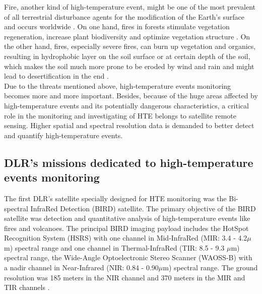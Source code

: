 \noindent Fire, another kind of high-temperature event, might be one of the most prevalent of all terrestrial disturbance agents for the modification of the Earth's surface and occurs worldwide \parencite{Reference6}. On one hand, fires in forests stimulate vegetation regeneration, increase plant biodiversity and optimize vegetation structure \parencite{Reference7}. On the other hand, fires, especially severe fires, can burn up vegetation and organics, resulting in hydrophobic layer on the soil surface or at certain depth of the soil, which makes the soil much more prone to be eroded by wind and rain and might lead to desertification in the end \parencite{Reference8}.\\

\noindent Due to the threats mentioned above, high-temperature events monitoring becomes more and more important. Besides, because of the huge areas affected by high-temperature events and its potentially dangerous characteristics, a critical role in the monitoring and investigating of HTE belongs to satellite remote sensing. Higher spatial and spectral resolution data is demanded to better detect and quantify high-temperature events.\\


\subsection{DLR's missions dedicated to high-temperature events monitoring}

The first DLR's satellite specially designed for HTE monitoring was the Bi-spectral InfraRed Detection (BIRD) satellite. The primary objective of the BIRD satellite was detection and quantitative analysis of high-temperature events like fires and volcanoes. The principal BIRD imaging payload includes the HotSpot Recognition System (HSRS) with one channel in Mid-InfraRed (MIR: 3.4 - 4.2$\mu$m) spectral range and one channel in Thermal-InfraRed (TIR: 8.5 - 9.3 $\mu$m) spectral range, the Wide-Angle Optoelectronic Stereo Scanner (WAOSS-B) with a nadir channel in Near-Infrared (NIR: 0.84 - 0.90$\mu$m) spectral range. The ground resolution was 185 meters in the NIR channel and 370 meters in the MIR and TIR channels \parencite{Reference9}.\\

